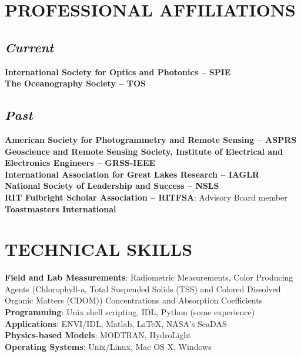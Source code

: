 \documentclass[11pt]{res} %
\begin{document}
\begin{resume}
\vspace{-0.1in}
\section{PROFESSIONAL AFFILIATIONS}
\vspace{-0.1in}
\subsection{\it Current}
\vspace{-0.2in}
{\bf International Society for Optics and Photonics -- SPIE}
\vspace{0.1in}\\
{\bf The Oceanography Society -- TOS}
\vspace{-0.2in}
\subsection{\it Past}
\vspace{-0.2in}
{\bf American Society for Photogrammetry and Remote Sensing -- ASPRS}
\vspace{0.1in}\\
{\bf Geoscience and Remote Sensing Society, Institute of Electrical and Electronics Engineers -- GRSS-IEEE}
\vspace{0.1in}\\
{\bf International Association for Great Lakes Research -- IAGLR}
\vspace{0.1in}\\
{\bf National Society of Leadership and Success -- NSLS}
\vspace{0.1in}\\
{\bf RIT Fulbright Scholar Association -- RITFSA}: Advisory Board member
\vspace{0.1in}\\
{\bf Toastmasters International}

\section{TECHNICAL SKILLS}
\vspace{0.1in}
{\bf Field and Lab Measurements}: Radiometric Measurements, Color Producing Agents (Chlorophyll-{\it a}, Total Suspended Solids (TSS) and Colored Dissolved Organic Matters (CDOM)) Concentrations and Absorption Coefficients
\vspace{0.1in}\\
{\bf Programming}: Unix shell scripting, IDL, Python (some experience)
\vspace{0.1in}\\
{\bf Applications}: ENVI/IDL, Matlab, LaTeX, NASA's SeaDAS
\vspace{0.1in}\\
{\bf Physics-based Models}: MODTRAN, HydroLight
\vspace{0.1in}\\
{\bf Operating Systems}: Unix/Linux, Mac OS X, Windows\\


\end{resume}
\end{document}
